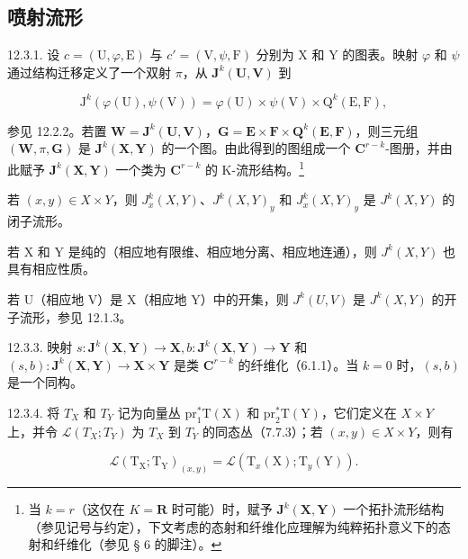 \subsection{喷射流形}

12.3.1. 设 \(c = (\mathrm{U}, \varphi, \mathrm{E})\) 与 \(c' = (\mathrm{V}, \psi, \mathrm{F})\) 分别为 X 和 Y 的图表。映射 \(\varphi\) 和 \(\psi\) 通过结构迁移定义了一个双射 \(\pi\)，从 \(\mathbf{J}^k (\mathbf{U},\mathbf{V})\) 到

\[
\mathrm{J} ^ {k} (\varphi (\mathrm{U}), \psi (\mathrm{V})) = \varphi (\mathrm{U}) \times \psi (\mathrm{V}) \times \mathrm{Q} ^ {k} (\mathrm{E}, \mathrm{F}),
\]

参见 12.2.2。若置 \(\mathbf{W} = \mathbf{J}^{k}(\mathbf{U},\mathbf{V})\)，\(\mathbf{G} = \mathbf{E}\times \mathbf{F}\times \mathbf{Q}^{k}(\mathbf{E},\mathbf{F})\)，则三元组 \((\mathbf{W},\pi ,\mathbf{G})\) 是 \(\mathbf{J}^k (\mathbf{X},\mathbf{Y})\) 的一个图。由此得到的图组成一个 \(\mathbf{C}^{r - k}\)-图册，并由此赋予 \(\mathbf{J}^k (\mathbf{X},\mathbf{Y})\) 一个类为 \(\mathbf{C}^{r - k}\) 的 K-流形结构。\footnote{当 \(k=r\)（这仅在 \(K=\mathbf{R}\) 时可能）时，赋予 \(\mathbf{J}^{k}(\mathbf{X},\mathbf{Y})\) 一个拓扑流形结构（参见记号与约定），下文考虑的态射和纤维化应理解为纯粹拓扑意义下的态射和纤维化（参见 § 6 的脚注）。}

若 \((x, y) \in X \times Y\)，则 \(J_{x}^{k}(X, Y)\)、\(J^{k}(X, Y)_{y}\) 和 \(J_{x}^{k}(X, Y)_{y}\) 是 \(J^{k}(X, Y)\) 的闭子流形。

若 X 和 Y 是纯的（相应地有限维、相应地分离、相应地连通），则 \(J^{k}(X, Y)\) 也具有相应性质。

若 U（相应地 V）是 X（相应地 Y）中的开集，则 \(J^{k}(U, V)\) 是 \(J^{k}(X, Y)\) 的开子流形，参见 12.1.3。

12.3.3. 映射 \(s: \mathbf{J}^{k}(\mathbf{X}, \mathbf{Y}) \to \mathbf{X}, b: \mathbf{J}^{k}(\mathbf{X}, \mathbf{Y}) \to \mathbf{Y}\) 和 \((s, b): \mathbf{J}^{k}(\mathbf{X}, \mathbf{Y}) \to \mathbf{X} \times \mathbf{Y}\) 是类 \(\mathbf{C}^{r - k}\) 的纤维化（6.1.1）。当 \(k = 0\) 时，\((s, b)\) 是一个同构。

12.3.4. 将 \(T_{X}\) 和 \(T_{Y}\) 记为向量丛 \(\mathrm{pr}_{1}^{*}\mathrm{T}(\mathrm{X})\) 和 \(\mathrm{pr}_{2}^{*}\mathrm{T}(\mathrm{Y})\)，它们定义在 \(X \times Y\) 上，并令 \(\mathcal{L}(T_{X}; T_{Y})\) 为 \(T_{X}\) 到 \(T_{Y}\) 的同态丛（7.7.3）；若 \((x, y) \in X \times Y\)，则有

\[
\mathcal {L} (\mathrm{T} _ {\mathrm{X}}; \mathrm{T} _ {\mathrm{Y}}) _ {(x, y)} = \mathcal {L} (\mathrm{T} _ {x} (\mathrm{X}); \mathrm{T} _ {y} (\mathrm{Y})).
\]

